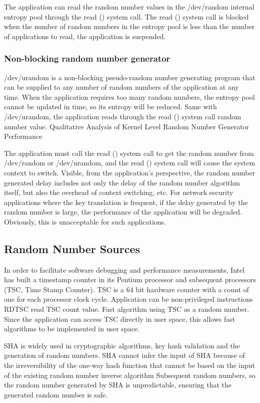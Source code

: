 \documentclass{IEEEtran}
\begin{document}
The application can read the random number values in the /dev/random internal entropy pool through the read () system call. The read () system call is blocked when the number of random numbers in the entropy pool is less than the number of applications to read, the application is suspended.

\subsubsection{Non-blocking random number generator}

/dev/urandom is a non-blocking pseudo-random number generating program that can be supplied to any number of random numbers of the application at any time. When the application requires too many random numbers, the entropy pool cannot be updated in time, so its entropy will be reduced. Same with /dev/urandom, the application reads through the read () system call random number value.
Qualitative Analysis of Kernel Level Random Number Generator Performance

The application must call the read () system call to get the random number from /dev/random or /dev/urandom, and the read () system call will cause the system context to switch. Visible, from the application's perspective, the random number generated delay includes not only the delay of the random number algorithm itself, but also the overhead of context switching, etc. For network security applications where the key translation is frequent, if the delay generated by the random number is large, the performance of the application will be degraded. Obviously, this is unacceptable for such applications.

\subsection{Random Number Sources}

In order to facilitate software debugging and performance measurements, Intel has built a timestamp counter in its Pentium processor and subsequent processors (TSC, Time Stamp Counter). TSC is a 64 bit hardware counter with a count of one for each processor clock cycle.  Application can be non-privileged instructions RDTSC read TSC count value. Fast algorithm using TSC as a random number. Since the application can access TSC directly in user space, this allows fast algorithms to be implemented in user space.

SHA is widely used in cryptographic algorithms, key hash validation and the generation of random numbers. SHA cannot infer the input of SHA because of the irreversibility of the one-way hash function that cannot be based on the input of the existing random number inverse algorithm Subsequent random numbers, so the random number generated by SHA is unpredictable, ensuring that the generated random number is safe.
\end{document}
